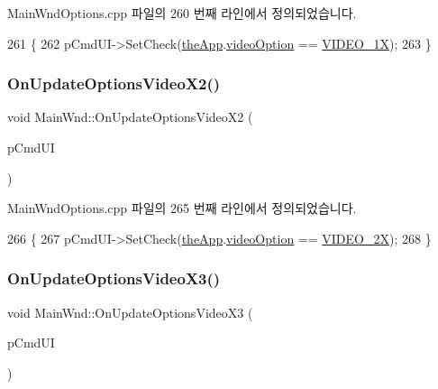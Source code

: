 Main\+Wnd\+Options.\+cpp 파일의 260 번째 라인에서 정의되었습니다.


\begin{DoxyCode}
261 \{
262   pCmdUI->SetCheck(\mbox{\hyperlink{_v_b_a_8cpp_a8095a9d06b37a7efe3723f3218ad8fb3}{theApp}}.\mbox{\hyperlink{class_v_b_a_a17dac073149c897f770c00ed7098ad32}{videoOption}} == \mbox{\hyperlink{_v_b_a_8h_a531c35e38ede3ea4e5ba5afb24b29493a3730d0de76011ce1f8af8b173ba948b1}{VIDEO\_1X}});
263 \}
\end{DoxyCode}
\mbox{\label{class_main_wnd_a8577839827a8f6684675feb1820dae88}} 
\subsubsection{\texorpdfstring{On\+Update\+Options\+Video\+X2()}{OnUpdateOptionsVideoX2()}}
{\footnotesize\ttfamily void Main\+Wnd\+::\+On\+Update\+Options\+Video\+X2 (\begin{DoxyParamCaption}\item[{C\+Cmd\+UI $\ast$}]{p\+Cmd\+UI }\end{DoxyParamCaption})\hspace{0.3cm}{\ttfamily [protected]}}



Main\+Wnd\+Options.\+cpp 파일의 265 번째 라인에서 정의되었습니다.


\begin{DoxyCode}
266 \{
267   pCmdUI->SetCheck(\mbox{\hyperlink{_v_b_a_8cpp_a8095a9d06b37a7efe3723f3218ad8fb3}{theApp}}.\mbox{\hyperlink{class_v_b_a_a17dac073149c897f770c00ed7098ad32}{videoOption}} == \mbox{\hyperlink{_v_b_a_8h_a531c35e38ede3ea4e5ba5afb24b29493a27e88963372725d01e5bff4aec1acd55}{VIDEO\_2X}});
268 \}
\end{DoxyCode}
\mbox{\label{class_main_wnd_aa6cb4b2f08200d2df0ead57a7d008ad9}} 
\subsubsection{\texorpdfstring{On\+Update\+Options\+Video\+X3()}{OnUpdateOptionsVideoX3()}}
{\footnotesize\ttfamily void Main\+Wnd\+::\+On\+Update\+Options\+Video\+X3 (\begin{DoxyParamCaption}\item[{C\+Cmd\+UI $\ast$}]{p\+Cmd\+UI }\end{DoxyParamCaption})\hspace{0.3cm}{\ttfamily [protected]}}



